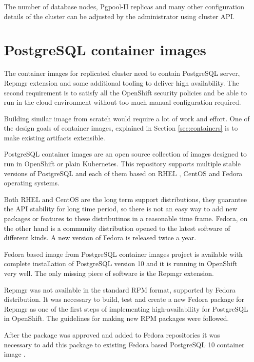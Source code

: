 \documentclass[
  digital, %
  twoside, %
  table,   %
  lof,     %
  lot,     %
]{fithesis3}
\begin{document}
The number of database nodes, Pgpool-II replicas and many other configuration details of the cluster can be adjusted by the administrator using cluster API.

\section{PostgreSQL container images} \label{sec:pg_cnt_images}
The container images for replicated cluster need to contain PostgreSQL server, Repmgr extension and some additional tooling to deliver high availability. The second requirement is to satisfy all the OpenShift security policies and be able to run in the cloud environment without too much manual configuration required.

Building similar image from scratch would require a lot of work and effort. One of the design goals of container images, explained in Section \ref{sec:containers} is to make existing artifacts extensible.

PostgreSQL container images \cite{pg_cnt} are an open source collection of images designed to run in OpenShift or plain Kubernetes. This repository supports multiple stable versions of PostgreSQL and each of them based on RHEL \cite{rhel}, CentOS \cite{centos} and Fedora \cite{getfedora} operating systems.

Both RHEL and CentOS are the long term support distributions, they guarantee the API stability for long time period, so there is not an easy way to add new packages or features to these distributinos in a reasonable time frame. Fedora, on the other hand is a community distribution opened to the latest software of different kinds. A new version of Fedora is released twice a year.

Fedora based image from PostgreSQL container images project is available with complete installation of PostgreSQL version 10 and it is running in OpenShift very well. The only missing piece of software is the Repmgr extension.

Repmgr was not available in the standard RPM \cite{rpm} format, supported by Fedora distribution. It was necessary to build, test and create a new Fedora package for Repmgr \cite{fedora_repmgr} as one of the first steps of implementing high-availability for PostgreSQL in OpenShift. The guidelines for making new RPM packages \cite{fedora_new_package} were followed.

After the package was approved and added to Fedora repositories \cite{fedora_repositories} it was necessary to add this package to existing Fedora based PostgreSQL 10 container image \cite{pg_img}.
\end{document}
